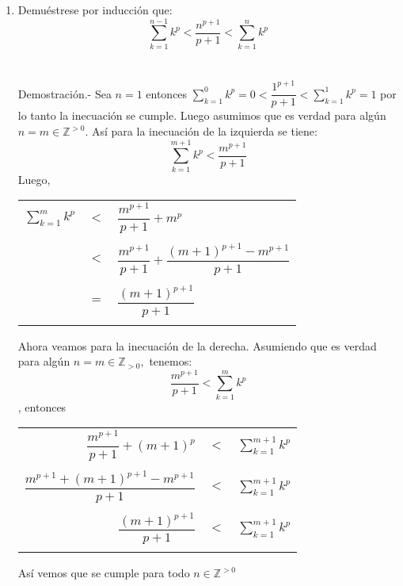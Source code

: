 \begin{enumerate}[ \bfseries 1.]
\begin{enumerate}[\bfseries (a)]
\item Demuéstrese por inducción que:
$$\displaystyle\sum_{k=1}^{n-1} k^p < \dfrac{n^{p+1}}{p+1} < \sum_{k=1}^n k^p$$\\\\
Demostración.- \; Sea $n=1$ entonces $\sum\limits_{k=1}^{0} k^p = 0 < \dfrac{1^{p+1}}{p+1}< \sum\limits_{k=1}^1 k^p =1$ por lo tanto la inecuación se cumple. Luego asumimos que es verdad para algún $n=m \in \mathbb{Z}^{>0}$. Así para la inecuación de la izquierda se tiene:
$$\sum\limits_{k=1}^{m+1} k^p < \dfrac{m^{p+1}}{p+1}$$ Luego,
\begin{center}
\begin{tabular}{rcl}
$\sum\limits_{k=1}^m k^p$&$<$&$\dfrac{m^{p+1}}{p+1} + m^p$\\\\
&$<$&$\dfrac{m^{p+1}}{p+1} + \dfrac{(m+1)^{p+1} - m^{p+1}}{p+1}$\\\\
&$=$&$\dfrac{(m+1)^{p+1}}{p+1}$\\\\
\end{tabular}
\end{center}
Ahora veamos para la inecuación de la derecha. Asumiendo que es verdad para algún $n= m \in \mathbb{Z}_{>0},$ tenemos:
$$\dfrac{m^{p+1}}{p+1} < \sum\limits_{k=1}^m k^p$$, entonces
\begin{center}
\begin{tabular}{rcl}
$\dfrac{m^{p+1}}{p+1} + (m+1)^p$&$<$&$\sum\limits_{k=1}^{m+1} k^p$\\\\
$\dfrac{m^{p+1} + (m+1)^{p+1} - m^{p+1}}{p+1}$&$<$&$\sum\limits_{k=1}^{m+1} k^p$\\\\
$\dfrac{(m+1)^{p+1}}{p+1}$&$<$&$\sum\limits_{k=1}^{m+1} k^p$\\\\
\end{tabular}
\end{center}
Así vemos que se cumple para todo $n \in \mathbb{Z}^{>0}$\\\\
\end{enumerate}


\end{enumerate}
